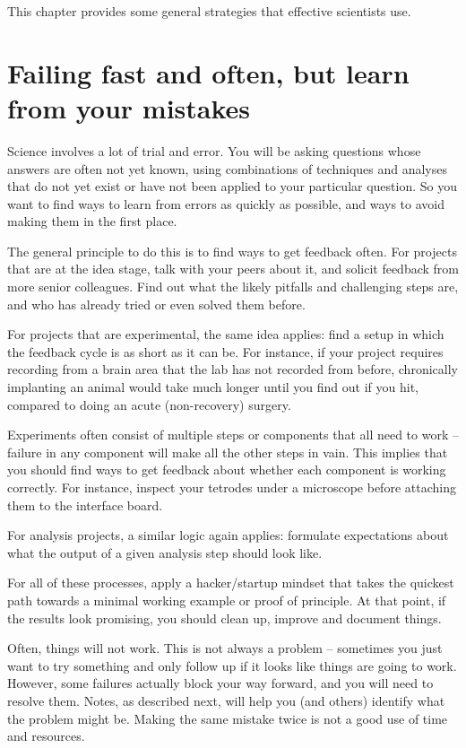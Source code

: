 \documentclass{tufte-book}
\begin{document}
This chapter provides some general strategies that effective
scientists use.

\section{Failing fast and often, but learn from your mistakes}

Science involves a lot of trial and error. You will be asking
questions whose answers are often not yet known, using combinations of
techniques and analyses that do not yet exist or have not been applied
to your particular question. So you want to find ways to learn from
errors as quickly as possible, and ways to avoid making them in the
first place.

The general principle to do this is to find ways to get feedback
often. For projects that are at the idea stage, talk with your peers
about it, and solicit feedback from more senior colleagues. Find out
what the likely pitfalls and challenging steps are, and who has
already tried or even solved them before.

For projects that are experimental, the same idea applies: find a
setup in which the feedback cycle is as short as it can be. For
instance, if your project requires recording from a brain area that
the lab has not recorded from before, chronically implanting an animal
would take much longer until you find out if you hit, compared to
doing an acute (non-recovery) surgery.

Experiments often consist of multiple steps or components that all
need to work -- failure in any component will make all the other steps
in vain. This implies
that you should find ways to get feedback about whether each component
is working correctly. For instance, inspect your tetrodes under a
microscope before attaching them to the interface board.

For analysis projects, a similar logic again applies: formulate
expectations about what the output of a given analysis step should
look like. 

For all of these processes, apply a hacker/startup mindset that takes
the quickest path towards a minimal working example or proof of
principle. At that point, if the results look promising, you should
clean up, improve and document things.

Often, things will not work. This is not always a problem -- sometimes
you just want to try something and only follow up if it looks like
things are going to work. However, some failures actually block your
way forward, and you will need to resolve them. Notes, as described
next, will help you (and others) identify what the problem might
be. Making the same mistake twice is not a good use of time and
resources.
\end{document}
